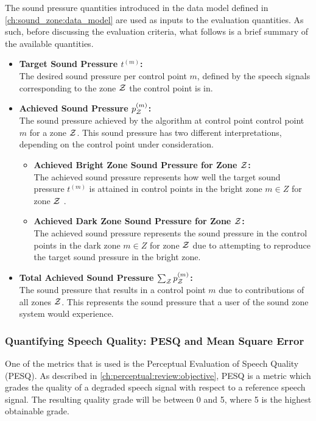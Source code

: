 The sound pressure quantities introduced in the data model defined in \autoref{ch:sound_zone:data_model} are used as inputs to the evaluation quantities.
As such, before discussing the evaluation criteria, what follows is a brief summary of the available quantities.
\begin{itemize}
    \item \textbf{Target Sound Pressure $t^{(m)}$:}\\
        The desired sound pressure per control point $m$, defined by the speech signals corresponding to the zone $\mathcal{Z}$ the control point is in.
    \item \textbf{Achieved Sound Pressure $p_{\mathcal{Z}}^{(m)}$:}\\
        The sound pressure achieved by the algorithm at control point control point $m$ for a zone $\mathcal{Z}$.
        This sound pressure has two different interpretations, depending on the control point under consideration.
        \begin{itemize}
            \item \textbf{Achieved Bright Zone Sound Pressure for Zone $\mathcal{Z}$:}\\
                The achieved sound pressure represents how well the target sound pressure $t^{(m)}$ is attained in control points in the 
                bright zone $m\in Z$ for zone $\mathcal{Z}$ .
            \item \textbf{Achieved Dark Zone Sound Pressure for Zone $\mathcal{Z}$:}\\
                The achieved sound pressure represents the sound pressure in the control points in the dark zone $m\in Z$ for zone $\mathcal{Z}$  
                due to attempting to reproduce the target sound pressure in the bright zone.
        \end{itemize}
    \item \textbf{Total Achieved Sound Pressure $\sum_{\mathcal{Z}} p_{\mathcal{Z}}^{(m)}$:}\\
        The sound pressure that results in a control point $m$ due to contributions of all zones $\mathcal{Z}$.
        This represents the sound pressure that a user of the sound zone system would experience.
\end{itemize}

\subsubsection*{Quantifying Speech Quality: PESQ and Mean Square Error}
One of the metrics that is used is the Perceptual Evaluation of Speech Quality (PESQ).
As described in \autoref{ch:perceptual:review:objective}, PESQ is a metric which grades the quality of a 
degraded speech signal with respect to a reference speech signal.
The resulting quality grade will be between 0 and 5, where 5 is the highest obtainable grade.

